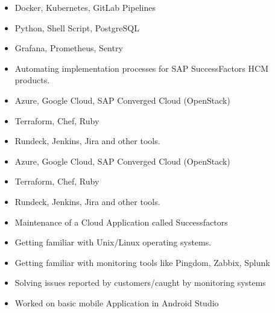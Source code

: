 \documentclass[10pt,a4paper,ragged2e,withhyper]{altacv}
\begin{document}
\begin{paracol}{2}

\begin{itemize}
\item Docker, Kubernetes, GitLab Pipelines
\item Python, Shell Script, PostgreSQL
\item Grafana, Prometheus, Sentry
\end{itemize}
\divider

\begin{itemize}
\item Automating implementation processes for SAP SuccessFactors HCM products. 
\item Azure, Google Cloud, SAP Converged Cloud (OpenStack)
\item Terraform, Chef, Ruby
\item Rundeck, Jenkins, Jira and other tools. 
\end{itemize}
\divider

\begin{itemize}
\item Azure, Google Cloud, SAP Converged Cloud (OpenStack)
\item Terraform, Chef, Ruby
\item Rundeck, Jenkins, Jira and other tools. 
\end{itemize}
\divider

\begin{itemize}
\item Maintenance of a Cloud Application called Successfactors
\item Getting familiar with Unix/Linux operating systems.
\item Getting familiar with monitoring tools like Pingdom, Zabbix, Splunk
\item Solving issues reported by customers/caught by monitoring systems 
\end{itemize}
\divider

\begin{itemize}
\item Worked on basic mobile Application in Android Studio
\end{itemize}
\vspace{22mm}


\end{paracol}
\end{document}
